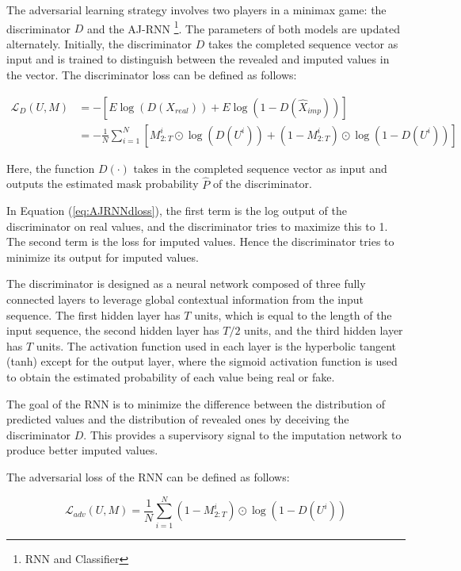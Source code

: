 The adversarial learning strategy involves two players in a minimax game: the discriminator $D$ and the AJ-RNN \footnote{RNN and Classifier}.
The parameters of both models are updated alternately.
Initially, the discriminator $D$ takes the completed sequence vector as input and is trained to distinguish between the revealed and imputed values in the vector.
The discriminator loss can be defined as follows:

\begin{align}
  \mathcal{L}_{D}(U, M) & = - [E \log(D(X_{real})) + E \log(1 - D(\hat{X}_{imp}))] \label{eq:AJRNNdloss} \\ 
                        & = - \frac{1}{N} \sum_{i=1}^N \left[ M^i_{2:T} \odot \log(D(U^i)) + (1 - M^i_{2:T}) \odot \log(1-D(U^i)) \right]
\end{align}

Here, the function $D(\cdot)$ takes in the completed sequence vector as input and outputs the estimated mask probability $\hat{P}$ of the discriminator.
 
In Equation (\ref{eq:AJRNNdloss}), the first term is the log output of the discriminator on real values, and the discriminator tries to maximize this to 1.
The second term is the loss for imputed values.
Hence the discriminator tries to minimize its output for imputed values.

The discriminator is designed as a neural network composed of three fully connected layers to leverage global contextual information from the input sequence.
The first hidden layer has $T$ units, which is equal to the length of the input sequence, the second hidden layer has $T/2$ units, and the third hidden layer has $T$ units. 
The activation function used in each layer is the hyperbolic tangent (tanh) except for the output layer, where the sigmoid activation function is used to obtain the estimated probability of each value being real or fake.

The goal of the RNN is to minimize the difference between the distribution of predicted values and the distribution of revealed ones by deceiving the discriminator $D$. 
This provides a supervisory signal to the imputation network to produce better imputed values. 

The adversarial loss of the RNN can be defined as follows:

\begin{equation}
  \mathcal{L}_{adv}(U, M) = \frac{1}{N} \sum_{i=1}^N  (1 - M^i_{2:T}) \odot \log(1 - D(U^i))
  \label{eq:AJRNNadvloss}
\end{equation}

